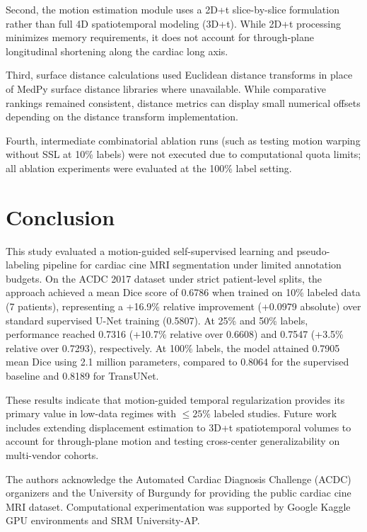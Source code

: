 \documentclass[pdflatex,sn-mathphys]{sn-jnl}
\theoremstyle{thmstyleone}
\theoremstyle{thmstyletwo}
\theoremstyle{thmstylethree}
\begin{document}
Second, the motion estimation module uses a 2D+t slice-by-slice formulation rather than full 4D spatiotemporal modeling (3D+t). While 2D+t processing minimizes memory requirements, it does not account for through-plane longitudinal shortening along the cardiac long axis.

Third, surface distance calculations used Euclidean distance transforms in place of MedPy surface distance libraries where unavailable. While comparative rankings remained consistent, distance metrics can display small numerical offsets depending on the distance transform implementation.

Fourth, intermediate combinatorial ablation runs (such as testing motion warping without SSL at 10\% labels) were not executed due to computational quota limits; all ablation experiments were evaluated at the 100\% label setting.

\section{Conclusion}\label{sec:conclusion}

This study evaluated a motion-guided self-supervised learning and pseudo-labeling pipeline for cardiac cine MRI segmentation under limited annotation budgets. On the ACDC 2017 dataset under strict patient-level splits, the approach achieved a mean Dice score of 0.6786 when trained on 10\% labeled data (7 patients), representing a +16.9\% relative improvement (+0.0979 absolute) over standard supervised U-Net training (0.5807). At 25\% and 50\% labels, performance reached 0.7316 (+10.7\% relative over 0.6608) and 0.7547 (+3.5\% relative over 0.7293), respectively. At 100\% labels, the model attained 0.7905 mean Dice using 2.1 million parameters, compared to 0.8064 for the supervised baseline and 0.8189 for TransUNet.

These results indicate that motion-guided temporal regularization provides its primary value in low-data regimes with $\le 25\%$ labeled studies. Future work includes extending displacement estimation to 3D+t spatiotemporal volumes to account for through-plane motion and testing cross-center generalizability on multi-vendor cohorts.

\backmatter

The authors acknowledge the Automated Cardiac Diagnosis Challenge (ACDC) organizers and the University of Burgundy for providing the public cardiac cine MRI dataset. Computational experimentation was supported by Google Kaggle GPU environments and SRM University-AP.
\end{document}
